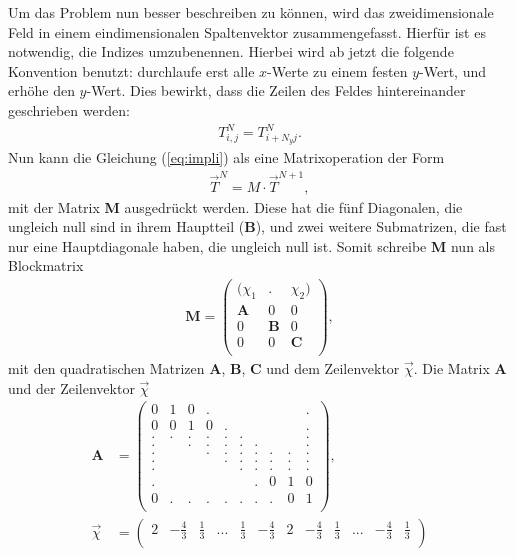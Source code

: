 \documentclass[12pt,a4paper,titlepage,headinclude,bibtotoc]{scrartcl}
\begin{document}
Um das Problem nun besser beschreiben zu können, wird das zweidimensionale Feld in einem eindimensionalen Spaltenvektor zusammengefasst. Hierfür ist es notwendig, die Indizes umzubenennen. Hierbei wird ab jetzt die folgende Konvention benutzt: durchlaufe erst alle $x$-Werte zu einem festen $y$-Wert, und erhöhe den $y$-Wert. Dies bewirkt, dass die Zeilen des Feldes hintereinander geschrieben werden:
\begin{align*}
T_{i,j}^{N} = T_{i+N_y j}^{N}.
\end{align*}
Nun kann die Gleichung (\ref{eq:impli}) als eine Matrixoperation der Form
\begin{align*}
\vec{T}^N = M \cdot \vec{T}^{N+1},
\end{align*} 
mit der Matrix \textbf{M} ausgedrückt werden.
Diese hat die fünf Diagonalen, die ungleich null sind in ihrem Hauptteil (\textbf{B}), und zwei weitere Submatrizen, die fast nur eine Hauptdiagonale haben, die ungleich null ist.
Somit schreibe \textbf{M} nun als Blockmatrix
\begin{align*}
 \boldsymbol{M}  =  \begin{pmatrix}
 (\chi_1 & . & \chi_2) \\
  \textbf{A}  & 0 & 0 \\
  0  & \textbf{B} & 0 \\
  0  & 0 & \textbf{C} \\
 \end{pmatrix}
,
\end{align*}
mit den quadratischen Matrizen \textbf{A}, \textbf{B}, \textbf{C} und dem Zeilenvektor $\vec{\chi}$. Die Matrix \textbf{A} und der Zeilenvektor $\vec{\chi}$
\setcounter{MaxMatrixCols}{25}
\begin{align*}
\boldsymbol{A} &=
  \begin{pmatrix}
  0  & 1 & 0 & . &   &   &   &   &   & . \\
  0  & 0 & 1 & 0 & . &   &   &   &   & . \\
  .  & . & . & . & . & . &   &   &   & . \\
  .  &   & . & . & . & . & . &   &   & . \\
  .  &   &   & . & . & . & . & . & . & . \\
  .  &   &   &   & . & . & . & . & . & . \\
  .  &   &   &   &   & . & . & . & . & . \\
  .  &   &   &   &   &   & . & 0 & 1 & 0 \\
  0  & . & . & . & . & . & . & . & 0 & 1 \\
 \end{pmatrix}
 ,\\
 \vec{\chi} &= \begin{pmatrix}
 2  & -\frac{4}{3} & \frac{1}{3} & ... & \frac{1}{3} & -\frac{4}{3} & 2 & -\frac{4}{3} & \frac{1}{3} & ... & -\frac{4}{3} & \frac{1}{3} \\
 \end{pmatrix}
 \end{align*}
\end{document}
